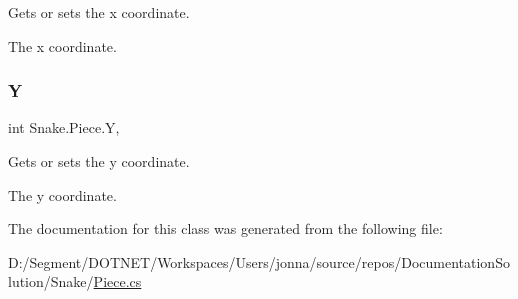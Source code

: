Gets or sets the x coordinate. 

The x coordinate. \mbox{\label{class_snake_1_1_piece_a216699c0710be0b0b42ce568157e51b9}} 
\subsubsection{\texorpdfstring{Y}{Y}}
{\footnotesize\ttfamily int Snake.\+Piece.\+Y\hspace{0.3cm}{\ttfamily [get]}, {\ttfamily [set]}}



Gets or sets the y coordinate. 

The y coordinate. 

The documentation for this class was generated from the following file\+:\begin{DoxyCompactItemize}
\item 
D\+:/\+Segment/\+D\+O\+T\+N\+E\+T/\+Workspaces/\+Users/jonna/source/repos/\+Documentation\+Solution/\+Snake/\mbox{\hyperlink{_piece_8cs}{Piece.\+cs}}\end{DoxyCompactItemize}
